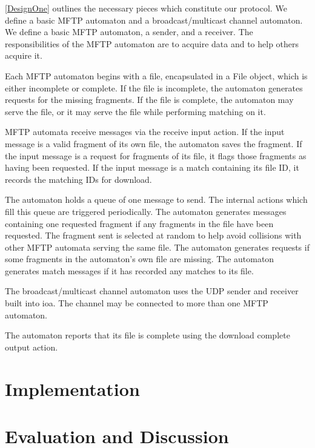 \documentclass[letterpaper]{article}
\begin{document}
\ref{DesignOne} outlines the necessary pieces which constitute our protocol.
We define a basic MFTP automaton and a broadcast/multicast channel automaton.
We define a basic MFTP automaton, a sender, and a receiver.
The responsibilities of the MFTP automaton are to acquire data and to help others acquire it.

Each MFTP automaton begins with a file, encapsulated in a File object, which is either incomplete or complete.
If the file is incomplete, the automaton generates requests for the missing fragments.
If the file is complete, the automaton may serve the file, or it may serve the file while performing matching on it.

MFTP automata receive messages via the receive input action.
If the input message is a valid fragment of its own file, the automaton saves the fragment.
If the input message is a request for fragments of its file, it flags those fragments as having been requested.
If the input message is a match containing its file ID, it records the matching IDs for download.

The automaton holds a queue of one message to send. 
The internal actions which fill this queue are triggered periodically.
The automaton generates messages containing one requested fragment if any fragments in the file have been requested.
The fragment sent is selected at random to help avoid collisions with other MFTP automata serving the same file.
The automaton generates requests if some fragments in the automaton's own file are missing.
The automaton generates match messages if it has recorded any matches to its file.

The broadcast/multicast channel automaton uses the UDP sender and receiver built into ioa.
The channel may be connected to more than one MFTP automaton.

The automaton reports that its file is complete using the download complete output action.

\section{Implementation}

\section{Evaluation and Discussion\label{evaluation}}
\end{document}
